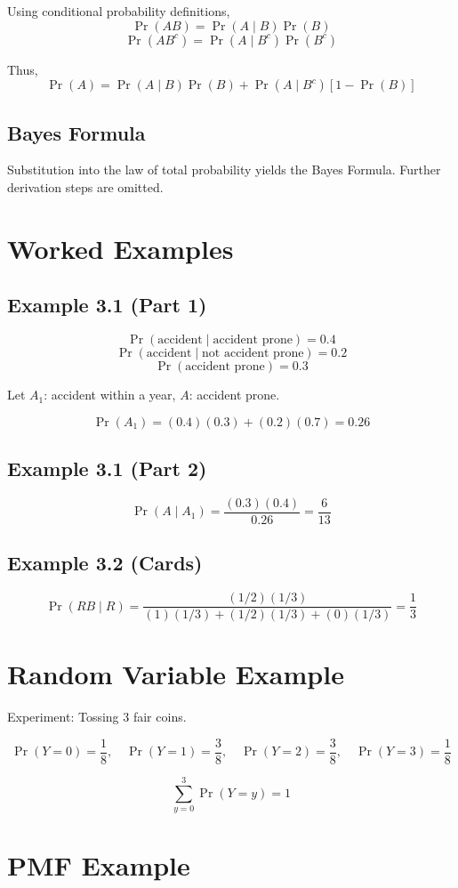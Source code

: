 \documentclass[11pt]{article}
\begin{document}
Using conditional probability definitions,
\[
\Pr(AB) = \Pr(A \mid B)\Pr(B)
\]
\[
\Pr(AB^{c}) = \Pr(A \mid B^{c})\Pr(B^{c})
\]

Thus,
\[
\Pr(A) = \Pr(A \mid B)\Pr(B) + \Pr(A \mid B^{c})[1 - \Pr(B)]
\]

\subsection*{Bayes Formula}
Substitution into the law of total probability yields the Bayes Formula. Further derivation steps are omitted.

\section*{Worked Examples}

\subsection*{Example 3.1 (Part 1)}
\[
\Pr(\text{accident} \mid \text{accident prone}) = 0.4
\]
\[
\Pr(\text{accident} \mid \text{not accident prone}) = 0.2
\]
\[
\Pr(\text{accident prone}) = 0.3
\]

Let $A_1$: accident within a year, $A$: accident prone.

\[
\Pr(A_1) = (0.4)(0.3) + (0.2)(0.7) = 0.26
\]

\subsection*{Example 3.1 (Part 2)}
\[
\Pr(A \mid A_1) = \frac{(0.3)(0.4)}{0.26} = \frac{6}{13}
\]

\subsection*{Example 3.2 (Cards)}
\[
\Pr(RB \mid R) =
\frac{(1/2)(1/3)}{(1)(1/3) + (1/2)(1/3) + (0)(1/3)} = \frac{1}{3}
\]

\section*{Random Variable Example}

Experiment: Tossing 3 fair coins.

\[
\Pr(Y=0)=\frac{1}{8},\quad
\Pr(Y=1)=\frac{3}{8},\quad
\Pr(Y=2)=\frac{3}{8},\quad
\Pr(Y=3)=\frac{1}{8}
\]

\[
\sum_{y=0}^{3}\Pr(Y=y)=1
\]

\section*{PMF Example}
\end{document}
